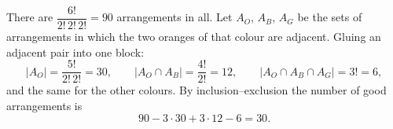 There are $\dfrac{6!}{2!\,2!\,2!}=90$ arrangements in all. Let $A_O$, $A_B$, $A_G$ be the sets of arrangements in which the two oranges of that colour are adjacent. Gluing an adjacent pair into one block:
\[
|A_O|=\dfrac{5!}{2!\,2!}=30,\qquad|A_O\cap A_B|=\dfrac{4!}{2!}=12,\qquad|A_O\cap A_B\cap A_G|=3!=6 ,
\]
and the same for the other colours. By inclusion--exclusion the number of good arrangements is
\[
90-3\cdot30+3\cdot12-6=\boxed{30}.
\]

